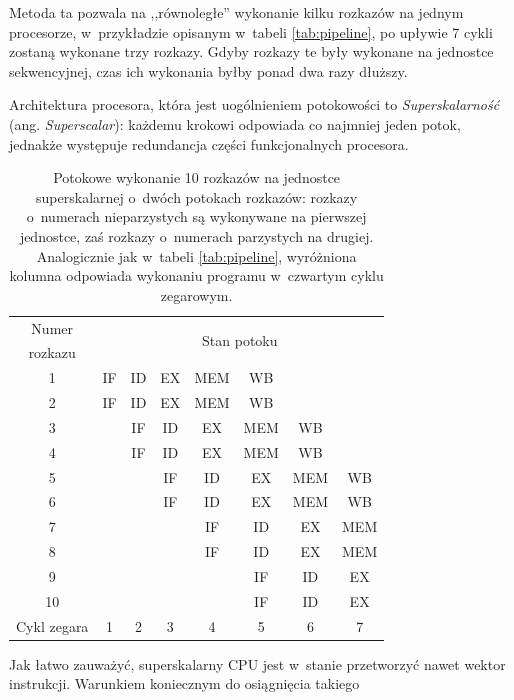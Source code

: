 \documentclass[11pt,makeidx]{mwart}
\begin{document}
	Metoda ta pozwala na ,,równoległe'' wykonanie kilku rozkazów na jednym procesorze, w~przykładzie opisanym w~tabeli \ref{tab:pipeline}, po upływie 7 cykli
	zostaną wykonane trzy rozkazy. Gdyby rozkazy te były wykonane na jednostce sekwencyjnej, czas ich wykonania byłby ponad dwa razy dłuższy.
\par
%
\indent
	Architektura procesora, która jest uogólnieniem potokowości to \emph{Superskalarność} (ang. \emph{Superscalar}): 
	każdemu krokowi odpowiada co najmniej jeden potok, jednakże występuje redundancja części funkcjonalnych procesora.
	\begin{table}[h]
	\centering
	\begin{tabular}{|c|c|c|c|c|c|c|c|} \hline
	Numer 		 & \multicolumn{7}{c|}{\multirow{2}{*}{Stan potoku}} \\
	rozkazu & \multicolumn{7}{c|}{} \\ \hline
	1 & IF & ID & EX & \cellcolor{yellow} MEM & WB & & \\ \hline
	2 & IF & ID & EX & \cellcolor{yellow} MEM & WB & & \\ \hline
	3 & & IF & ID & \cellcolor{yellow} EX & MEM & WB & \\ \hline
	4 & & IF & ID & \cellcolor{yellow} EX & MEM & WB & \\ \hline
	5 & & & IF & \cellcolor{yellow} ID & EX & MEM & WB \\ \hline
	6 & & & IF & \cellcolor{yellow} ID & EX & MEM & WB \\ \hline
	7 & & & & \cellcolor{yellow} IF & ID & EX & MEM \\ \hline
	8 & & & & \cellcolor{yellow} IF & ID & EX & MEM \\ \hline
	9 & & & & \cellcolor{yellow} & IF & ID & EX \\ \hline
	10 & & & & \cellcolor{yellow} & IF & ID & EX \\ \hline \hline
	Cykl zegara & 1 & 2 & 3 & \cellcolor{yellow} 4 & 5 & 6 & 7 \\ \hline
	\end{tabular}
	\caption[Potokowe wykonanie 10 rozkazów na jednostce superskalarnej]
					{Potokowe wykonanie 10 rozkazów na jednostce superskalarnej o~dwóch potokach rozkazów: rozkazy o~numerach nieparzystych są wykonywane na 
					pierwszej jednostce, zaś rozkazy o~numerach parzystych na drugiej. Analogicznie jak w~tabeli \ref{tab:pipeline}, wyróżniona
					kolumna odpowiada wykonaniu programu w~czwartym cyklu zegarowym.}
	\end{table}
	Jak łatwo zauważyć, superskalarny CPU jest w~stanie przetworzyć nawet wektor instrukcji. Warunkiem koniecznym do osiągnięcia takiego
\end{document}
